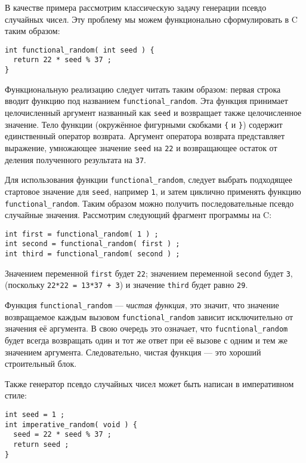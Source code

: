 В качестве примера рассмотрим классическую задачу генерации псевдо случайных чисел. Эту проблему мы можем функционально сформулировать в C таким образом:

\begin{lstlisting}
int functional_random( int seed ) {
  return 22 * seed % 37 ;
}
\end{lstlisting}

Функциональную реализацию следует читать таким образом: первая строка вводит функцию под названием \lstinline|functional_random|. Эта функция принимает целочисленный аргумент названный как \lstinline|seed| и возвращает также целочисленное значение. Тело функции (окружённое фигурными скобками \lstinline|{| и \lstinline|}|) содержит единственный оператор возврата. Аргумент оператора возврата представляет выражение, умножающее значение \lstinline|seed| на \lstinline|22| и возвращающее остаток от деления полученного результата на \lstinline|37|.

Для использования функции \lstinline|functional_random|, следует выбрать подходящее стартовое значение для \lstinline|seed|, например \lstinline|1|, и затем циклично применять функцию \lstinline|functional_random|. Таким образом можно получить последовательные псевдо случайные значения. Рассмотрим следующий фрагмент программы на C:

\begin{lstlisting}
int first = functional_random( 1 ) ;
int second = functional_random( first ) ;
int third = functional_random( second ) ;
\end{lstlisting}

Значением переменной \lstinline|first| будет \lstinline|22|; значением переменной \lstinline|second| будет \lstinline|3|, (поскольку \lstinline|22*22 = 13*37 + 3|) и значение \lstinline|third| будет равно \lstinline|29|.

Функция \lstinline|functional_random| --- \emph{чистая функция}, это значит, что значение возвращаемое каждым вызовом \lstinline|functional_random| зависит исключительно от значения её аргумента. В свою очередь это означает, что \lstinline|fucntional_random| будет всегда возвращать один и тот же ответ при её вызове с одним и тем же значением аргумента. Следовательно, чистая функция --- это хороший строительный блок.

Также генератор псевдо случайных чисел может быть написан в императивном стиле:

\begin{lstlisting}
int seed = 1 ;
int imperative_random( void ) {
  seed = 22 * seed % 37 ;
  return seed ;
}
\end{lstlisting}

